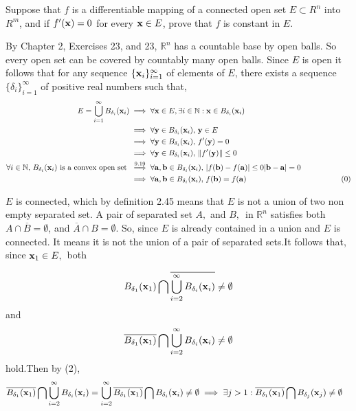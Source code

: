 \documentclass{article}
\newcommand\N{\mathbb{N}}
\newcommand\R{\mathbb{R}}
\begin{document}
Suppose that $f$ is a differentiable mapping of a connected open set
$E\subset R^n$ into $R^m$, and if $f'(\vb{x}) = 0 $ for every
$\vb{x}\in E$, prove that $f$ is constant in $E$.


By  Chapter 2, Exercises 23, and 23, $\R^n$ has a countable base by
open balls. So every open set can be covered by countably many open
balls. Since $E$ is open it follows that for any sequence $\{\vb{x}_i\}_{i=
  1}^{\infty}$ of elements of $E$, there exists a
sequence $\{\delta_i\}_{i=1}^\infty$ of positive real numbers
such that,
\begin{align*}
  E = \bigcup_{i=1}^\infty B_{\delta_i}(\vb{x}_i)
&\implies \forall \vb{x}\in E,\exists i\in \N: \vb{x} \in B_{\delta_i}(\vb{x}_i)\\
  &\implies \forall \vb{y} \in
    B_{\delta_i}(\vb{x}_i),\, \vb{y} \in E \\
  &\implies \forall \vb{y} \in
    B_{\delta_i}(\vb{x}_i),\, f'(\vb{y}) = 0\\
  &\implies \forall \vb{y} \in
    B_{\delta_i}(\vb{x}_i),\, \|f'(\vb{y})\| \leq 0\\
  \forall i \in \N,\, B_{\delta_i}(\vb{x}_i)\text{ is a convex open set
  }&\overset{9.19}{\implies}  \forall \vb{a},\vb{b}\in
     B_{\delta_i}(\vb{x}_i),\,  |f(\vb{b})-f(\vb{a})|\leq 0
     |\vb{b}-\vb{a}| = 0\\
  &\implies \forall \vb{a},\vb{b}\in
     B_{\delta_i}(\vb{x}_i),\, f(\vb{b}) = f(\vb{a}) &\hspace{1.5cm}\text{(0)}
\end{align*}


$E$ is connected, which by definition 2.45 means that $E$ is not a
union of two non empty separated set. A pair of separated set $A,$ and $ B,\,$
in $\R^n$ satisfies both $A\cap \overline{B} = \emptyset$, and $
\overline{A}\cap B = \emptyset$. So, since $E$ is already contained in a
union and $E$ is connected. It means it is not the union of a pair of
separated sets.It follows that, since $\vb{x}_1 \in E,\,$ both

\begin{equation}
  B_{\delta_1}(\vb{x}_1)
  \bigcap \overline{\bigcup_{i= 2}^\infty
    B_{\delta_i}(\vb{x}_i)} \neq \emptyset\end{equation}
and
\begin{equation}\overline{B_{\delta_1}(\vb{x}_1)}
  \bigcap \bigcup_{i=2}^\infty
  B_{\delta_i}(\vb{x}_i)\neq \emptyset \end{equation}
hold.Then by (2),
\begin{align*}
 \overline{B_{\delta_1}(\vb{x}_1)}
  \bigcap \bigcup_{i = 2}^\infty
  B_{\delta_i}(\vb{x}_i) &= \bigcup_{i = 2}^\infty \overline{B_{\delta_1}(\vb{x}_1)}
  \bigcap
                               B_{\delta_i}(\vb{x}_i)\neq \emptyset
  \implies \exists j > 1: \overline{B_{\delta_1}(\vb{x}_1)}
  \bigcap
                               B_{\delta_j}(\vb{x}_j)\neq \emptyset
\end{align*}
\end{document}
